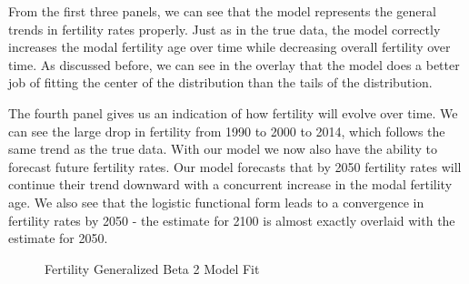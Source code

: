 \documentclass[10pt]{article}
\renewcommand{\thesection}{\arabic{section}}
\renewcommand{\thesubsection}{\thesection.\arabic{subsection}}
\renewcommand{\thesubsubsection}{\thesubsection.\arabic{subsubsection}}
\renewcommand{\subsubsection}[2][]{\oldsubsubsection[#1]{#2}\index{#1}\label{sec:\thesubsubsection}}
\numberwithin{equation}{subsection}
\newcommand*{\FigureDir}{../../graphs}
\begin{document}
\par From the first three panels, we can see that the model represents the general trends in fertility rates properly. Just as in the true data, the model correctly increases the modal fertility age over time while decreasing overall fertility over time. As discussed before, we can see in the overlay that the model does a better job of fitting the center of the distribution than the tails of the distribution.

\par The fourth panel gives us an indication of how fertility will evolve over time. We can see the large drop in fertility from 1990 to 2000 to 2014, which follows the same trend as the true data. With our model we now also have the ability to forecast future fertility rates. Our model forecasts that by 2050 fertility rates will continue their trend downward with a concurrent increase in the modal fertility age. We also see that the logistic functional form leads to a convergence in fertility rates by 2050 - the estimate for 2100 is almost exactly overlaid with the estimate for 2050.

\begin{figure}[!ht]
   \centering
   \caption{\label{fig:\thesubsubsection.3}Fertility Generalized Beta 2 Model Fit}
\end{figure}


\subsubsection{Mortality Rates}
\end{document}

